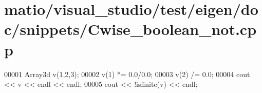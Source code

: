 \hypertarget{matio_2visual__studio_2test_2eigen_2doc_2snippets_2_cwise__boolean__not_8cpp_source}{}\section{matio/visual\+\_\+studio/test/eigen/doc/snippets/\+Cwise\+\_\+boolean\+\_\+not.cpp}
\label{matio_2visual__studio_2test_2eigen_2doc_2snippets_2_cwise__boolean__not_8cpp_source}

\begin{DoxyCode}
00001 Array3d v(1,2,3);
00002 v(1) *= 0.0/0.0;
00003 v(2) /= 0.0;
00004 cout << v << endl << endl;
00005 cout << !isfinite(v) << endl;
\end{DoxyCode}
